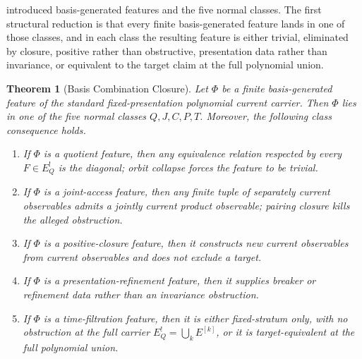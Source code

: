 \documentclass[11pt]{article}
\newcommand{\EQbang}{E^{!}_{Q}}
\newtheorem{theorem}{Theorem}[section]
\theoremstyle{definition}
\begin{document}
 introduced basis-generated
features and the five normal classes.  The first structural reduction
is that every finite basis-generated feature lands in one of those
classes, and in each class the resulting feature is either trivial,
eliminated by closure, positive rather than obstructive, presentation
data rather than invariance, or equivalent to the target claim at the
full polynomial union.

\begin{theorem}[Basis Combination Closure]
\label{thm:pvnp:basis-combination-closure}
Let \(\Phi\) be a finite basis-generated feature of the standard
fixed-presentation polynomial current carrier.  Then \(\Phi\) lies in
one of the five normal classes \(Q,J,C,P,T\).  Moreover, the following
class consequence holds.
\begin{enumerate}
\item[\(Q\).] If \(\Phi\) is a quotient feature, then any equivalence
  relation respected by every \(F\in\EQbang\) is the diagonal; orbit
  collapse forces the feature to be trivial.
\item[\(J\).] If \(\Phi\) is a joint-access feature, then any finite
  tuple of separately current observables admits a jointly current
  product observable; pairing closure kills the alleged obstruction.
\item[\(C\).] If \(\Phi\) is a positive-closure feature, then it
  constructs new current observables from current observables and does
  not exclude a target.
\item[\(P\).] If \(\Phi\) is a presentation-refinement feature, then
  it supplies breaker or refinement data rather than an invariance
  obstruction.
\item[\(T\).] If \(\Phi\) is a time-filtration feature, then it is
  either fixed-stratum only, with no obstruction at the full carrier
  \(\EQbang=\bigcup_k E^{[k]}\), or it is target-equivalent at the
  full polynomial union.
\end{enumerate}
\end{theorem}
\end{document}
